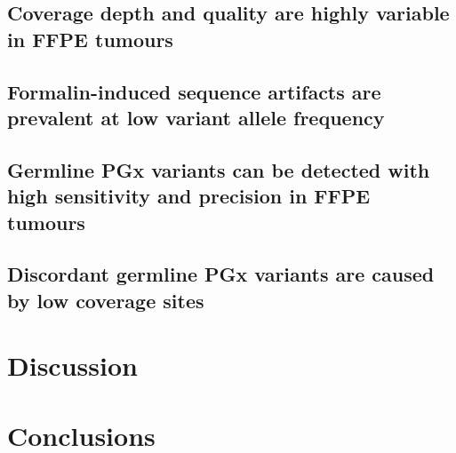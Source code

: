 \documentclass{bmcart}
\begin{document}
\subsection*{Coverage depth and quality are highly variable in FFPE tumours}

\subsection*{Formalin-induced sequence artifacts are prevalent at low variant allele frequency}

\subsection*{Germline PGx variants can be detected with high sensitivity and precision in FFPE tumours}

\subsection*{Discordant germline PGx variants are caused by low coverage sites}


\section*{Discussion}

\section*{Conclusions}

\end{document}

